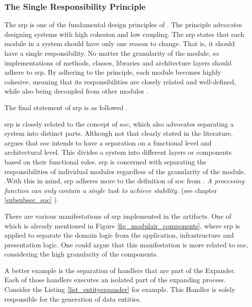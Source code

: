 \subsubsection{The Single Responsibility Principle} \label{subsubsec_srp}

The \gls{srp} is one of the fundamental design principles of \ca. The principle
advocates designing systems with high cohesion and low coupling. The \gls{srp} states that
each module in a system should have only one reason to change. That is, it should have a
single responsibility. No matter the granularity of the module, so implementations of
methods, classes, libraries and architecture layers should adhere to \gls{srp}. By
adhering to the principle, each module becomes highly cohesive, meaning that its
responsibilities are closely related and well-defined, while also being decoupled from
other modules \parencite[81]{robert_c_martin_clean_2018}.

The final statement of \gls{srp} is as followed
\parencite[82]{robert_c_martin_clean_2018}.


\gls{srp} is closely related to the concept of \gls{soc}, which also advocates separating
a system into distinct parts. Although not that clearly stated in the literature,
\citeauthor{robert_c_martin_clean_2018} argues that \gls{soc} intends to have a separation
on a functional level and architectural level. This divides a system into different layers
or components based on their functional roles. \gls{srp} is concerned with separating the
responsibilities of individual modules regardless of the granularity of the module.
\parencite[205]{robert_c_martin_clean_2018}.With this in mind, \gls{srp} adheres more to
the definition of \gls{soc} from \ns. \textit{A processing function can only contain
a single task to achieve stability.} (see chapter \ref{subsubsec_soc}
).

There are various manifestations of \gls{srp} implemented in the artifacts. One of which is
already mentioned in Figure \ref{fig_modulair_components}, where \gls{srp} is applied to
separate the domain logic from the application, infrastructure and presentation logic. One
could argue that this manifestation is more related to \gls{soc}, considering the high
granularity of the components.

A better example is the separation of handlers that are part of the \ca
Expander. Each of those handlers executes an isolated part of the expanding process.
Consider the Listing \ref{list_entityexpander} 
\parencite{koks_expandentitieshandlerinteractor_2023} for example. This Handler is solely
responsible for the generation of data entities. 

